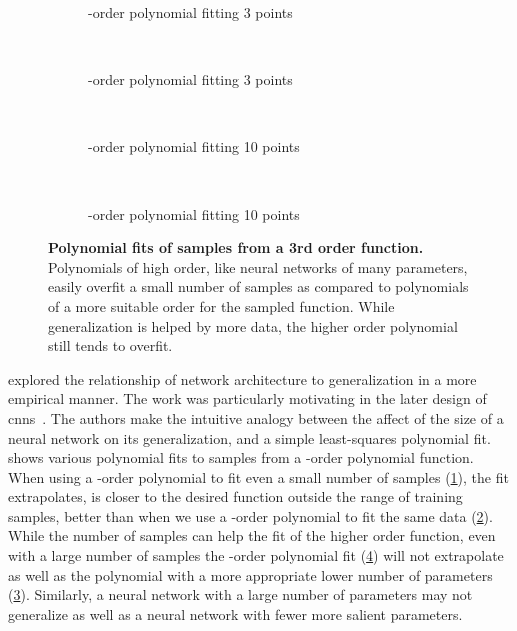 \documentclass[thesis]{subfiles}
\begin{document}
	\begin{figure}[tb]
		\centering
		\begin{subfigure}[t]{0.49\textwidth}
			\resizebox{\linewidth}{!}{}
			\caption{-order polynomial fitting 3 points}
			\label{fig:polyfit3rd}
		\end{subfigure}
		~
		\begin{subfigure}[t]{0.49\textwidth}
			\resizebox{\linewidth}{!}{}
			\caption{-order polynomial fitting 3 points}
			\label{fig:polyfit20th}
		\end{subfigure}\\	
		\begin{subfigure}[t]{0.49\textwidth}
			\resizebox{\linewidth}{!}{}
			\caption{-order polynomial fitting 10 points}
			\label{fig:polyfit3rdlots}
		\end{subfigure}
		~
		\begin{subfigure}[t]{0.49\textwidth}
			\resizebox{\linewidth}{!}{}
			\caption{-order polynomial fitting 10 points}
			\label{fig:polyfit20thlots}
		\end{subfigure}
		\caption[Polynomial fits of samples from a 3rd order function.]{\textbf{Polynomial fits of samples from a 3rd order function.} Polynomials of high order, like neural networks of many parameters, easily overfit a small number of samples as compared to polynomials of a more suitable order for the sampled function. While generalization is helped by more data, the higher order polynomial still tends to overfit.}
		\label{fig:polyfits}
	\end{figure}

	\citet{denker1987large} explored the relationship of network architecture to generalization in a more empirical manner. The work was particularly motivating in the later design of \glspl{cnn}~\citep{lecun1989generalization, lecun1989backpropagation}. The authors make the intuitive analogy between the affect of the size of a neural network on its generalization, and a simple least-squares polynomial fit.  shows various polynomial fits to samples from a -order polynomial function. When using a -order polynomial to fit even a small number of samples (\cref{fig:polyfit3rd}), the fit extrapolates, \ie is closer to the desired function outside the range of training samples, better than when we use a -order polynomial to fit the same data (\cref{fig:polyfit20th}). While the number of samples can help the fit of the higher order function, even with a large number of samples the -order polynomial fit  (\cref{fig:polyfit20thlots}) will not extrapolate as well as the polynomial with a more appropriate lower number of parameters (\cref{fig:polyfit3rdlots}). Similarly, a neural network with a large number of parameters may not generalize as well as a neural network with fewer more salient parameters.
    
\end{document}
